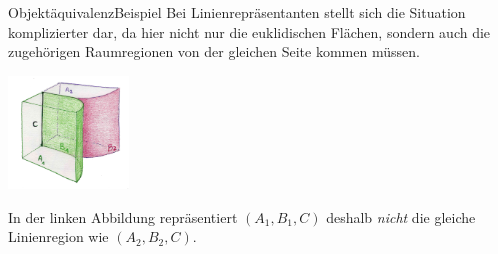 \documentclass[10pt,xcolor={dvipsnames}]{beamer}
\begin{document}
\begin{frame}{Objektäquivalenz}{Beispiel}
    Bei Linienrepräsentanten stellt sich die Situation komplizierter dar, da hier nicht nur die euklidischen Flächen, sondern auch die zugehörigen Raumregionen von der gleichen Seite kommen müssen.\\
    \vspace{0.5cm}
    \parbox{0.25\textwidth}{\includegraphics[height=3cm]{img/spart-linien_transparent.png}}
    \hfill\mbox{}\hfill
    \parbox{0.58\textwidth}{
        In der linken Abbildung repräsentiert $(A_1,B_1,C)$ deshalb \textit{nicht} die gleiche Linienregion wie $(A_2,B_2,C)$.
    }
    \hfill\mbox{}\hfill
\end{frame}




\end{document}
